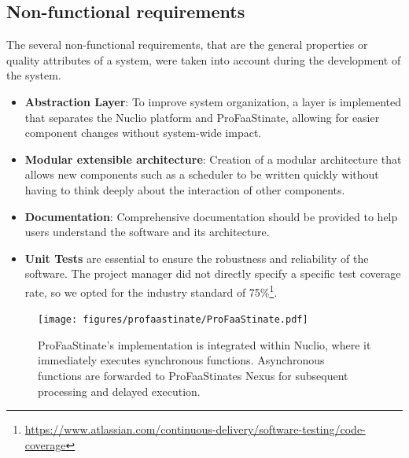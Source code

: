 \subsection {Non-functional requirements}
\label{sec:non-functional-req}
The several non-functional requirements, that are the general properties or quality attributes of a system, were taken into account during the development of the system. 
\begin{itemize}
    \item \textbf{Abstraction Layer}: To improve system organization, a layer is implemented that separates the Nuclio platform and ProFaaStinate, allowing for easier component changes without system-wide impact.
    \item \textbf{Modular extensible architecture}: Creation of a modular architecture that allows new components such as a scheduler to be written quickly without having to think deeply about the interaction of other components. 
    \item \textbf{Documentation}: Comprehensive documentation should be provided to help users understand the software and its architecture.
    \item \textbf{Unit Tests} are essential to ensure the robustness and reliability of the software. The project manager did not directly specify a specific test coverage rate, so we opted for the industry standard of 75\%\footnote{\url{https://www.atlassian.com/continuous-delivery/software-testing/code-coverage}}.
\end{itemize}


\begin{figure}
    \centering
    \texttt{[image: figures/profaastinate/ProFaaStinate.pdf]} 
    \caption{ProFaaStinate's implementation is integrated within Nuclio, where it immediately executes synchronous functions. Asynchronous functions are forwarded to ProFaaStinates Nexus for subsequent processing and delayed execution.}
    \label{fig:MPGA-architecture}
\end{figure}

